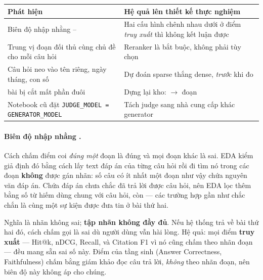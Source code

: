 \begin{center}\small
\begin{tabularx}{0.94\textwidth}{@{}p{5.4cm} L@{}}
\toprule
\textbf{Phát hiện} & \textbf{Hệ quả lên thiết kế thực nghiệm} \\
\midrule
Biên độ nhập nhằng \NumNoiseFloor{}--\NumNoiseCeiling{} &
  Hai cấu hình chênh nhau dưới \NumNoiseFloor{} ở điểm \emph{truy xuất}
  thì không kết luận được \\
Trung vị \NumDistractorMedian{} đoạn đối thủ cùng chủ đề cho mỗi câu hỏi &
  Reranker là bắt buộc, không phải tùy chọn \\
Câu hỏi neo vào tên riêng, ngày tháng, con số &
  Dự đoán sparse thắng dense, \emph{trước} khi đo \\
\NumCorpusRestored{} bài bị cắt mất phần đuôi &
  Dựng lại kho: \NumCorpusChunksVone{} $\rightarrow$ \NumCorpusChunks{} đoạn \\
Notebook cũ đặt \texttt{JUDGE\_MODEL = GENERATOR\_MODEL} &
  Tách judge sang nhà cung cấp khác generator \\
\bottomrule
\end{tabularx}
\end{center}

\paragraph{Biên độ nhập nhằng \NumNoiseFloor{}.}
Cách chấm điểm coi \emph{đúng một} đoạn là đúng và mọi đoạn khác là sai. EDA
kiểm giả định đó bằng cách lấy text đáp án của từng câu hỏi rồi đi tìm nó trong
các đoạn \textbf{không} được gán nhãn: \NumNoiseCeiling{} số câu có ít nhất một
đoạn như vậy chứa nguyên văn đáp án. Chứa đáp án chưa chắc đã trả lời được câu
hỏi, nên EDA lọc thêm bằng số từ hiếm dùng chung với câu hỏi, còn
\NumNoiseFloor{} --- các trường hợp gần như chắc chắn là cùng một sự kiện được
đưa tin ở bài thứ hai.

Nghĩa là nhãn không sai; \textbf{tập nhãn không đầy đủ}. Nếu hệ thống trả về bài
thứ hai đó, cách chấm gọi là sai dù người dùng vẫn hài lòng. Hệ quả: mọi điểm
\textbf{truy xuất} --- Hit@k, nDCG, Recall, và Citation F1 vì nó cũng chấm theo
nhãn đoạn --- đều mang sẵn sai số này. Điểm của tầng sinh (Answer Correctness,
Faithfulness) chấm bằng giám khảo đọc câu trả lời, \emph{không} theo nhãn đoạn,
nên biên độ này không áp cho chúng.


